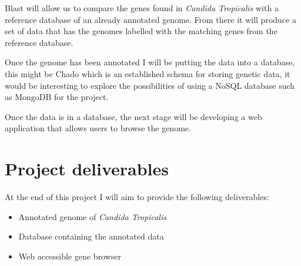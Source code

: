 \documentclass[11pt,fleqn,twoside]{article}
\begin{document}
Blast will allow us to compare the genes found in \textit{Candida Tropicalis} with a reference database of an already annotated genome. From there it will produce a set of data that has the genomes labelled with the matching genes from the reference database.

Once the genome has been annotated I will be putting the data into a database, this might be Chado\cite{chado} which is an established schema for storing genetic data, it would be interesting to explore the possibilities of using a NoSQL database such as MongoDB for the project. 

Once the data is in a database, the next stage will be developing a web application that allows users to browse the genome.


\section{Project deliverables}
At the end of this project I will aim to provide the following deliverables:

\begin{itemize}
  \item Annotated genome of \textit{Candida Tropicalis}
  \item Database containing the annotated data
  \item Web accessible gene browser
\end{itemize}

%
%
%


\nocite{*} %

\newpage
{}
%
%

\renewcommand{\refname}{Annotated Bibliography}  %
\end{document}
